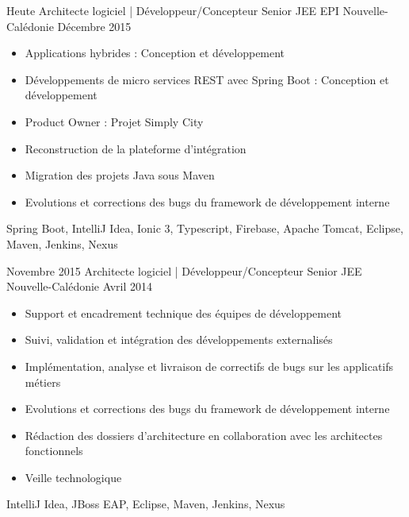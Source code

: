 %
%
%


\begin{experiences}
  \experience
  {Heute}
  {Architecte logiciel | Développeur/Concepteur Senior JEE}
  {EPI}
  {Nouvelle-Calédonie}
  {Décembre 2015}
  {
    \begin{itemize}
      \item Applications hybrides : Conception et développement
      \item Développements de micro services REST avec Spring Boot : Conception
            et développement
      \item Product Owner : Projet Simply City
      \item Reconstruction de la plateforme d'intégration
      \item Migration des projets Java sous Maven
      \item Evolutions et corrections des bugs du framework de développement
            interne
    \end{itemize}
  }
  {
    Spring Boot,
    IntelliJ Idea,
    Ionic 3,
    Typescript,
    Firebase,
    Apache Tomcat,
    Eclipse,
    Maven,
    Jenkins,
    Nexus
  }

  \emptySeparator

  \experience
  {Novembre 2015}
  {Architecte logiciel | Développeur/Concepteur Senior JEE}
  {}
  {Nouvelle-Calédonie}
  {Avril 2014}
  {
    \begin{itemize}
      \item Support et encadrement technique des équipes de développement
      \item Suivi, validation et intégration des développements externalisés
      \item Implémentation, analyse et livraison de correctifs de bugs sur les
            applicatifs métiers
      \item Evolutions et corrections des bugs du framework de développement
            interne
      \item Rédaction des dossiers d'architecture en collaboration avec les
            architectes fonctionnels
      \item Veille technologique
    \end{itemize}
  }
  {
    IntelliJ Idea,
    JBoss EAP,
    Eclipse,
    Maven,
    Jenkins,
    Nexus
  }


\end{experiences}
